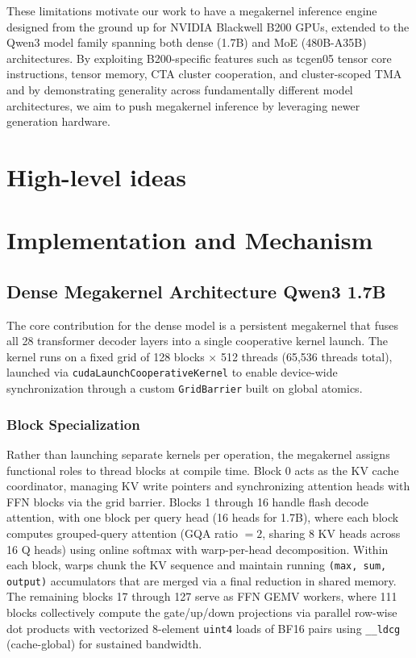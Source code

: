 \documentclass[sigplan,screen]{acmart}
\begin{document}
These limitations motivate our work to have a megakernel inference engine designed from the ground up for NVIDIA Blackwell B200 GPUs, extended to the Qwen3 model family spanning both dense (1.7B) and MoE (480B-A35B) architectures. By exploiting B200-specific features such as tcgen05 tensor core instructions, tensor memory, CTA cluster cooperation, and cluster-scoped TMA and by demonstrating generality across fundamentally different model architectures, we aim to push megakernel inference by leveraging newer generation hardware.

\section{High-level ideas}
\section{Implementation and Mechanism}
\subsection{Dense Megakernel Architecture Qwen3 1.7B}

The core contribution for the dense model is a persistent megakernel that fuses all 28 transformer decoder layers into a single cooperative kernel launch. The kernel runs on a fixed grid of 128 blocks $\times$ 512 threads (65{,}536 threads total), launched via \texttt{cudaLaunchCooperativeKernel} to enable device-wide synchronization through a custom \newline \texttt{GridBarrier} built on global atomics.

\subsubsection{Block Specialization}

Rather than launching separate kernels per operation, the megakernel assigns functional roles to thread blocks at compile time. Block 0 acts as the KV cache coordinator, managing KV write pointers and synchronizing attention heads with FFN blocks via the grid barrier. Blocks 1 through 16 handle flash decode attention, with one block per query head (16 heads for 1.7B), where each block computes grouped-query attention (GQA ratio $= 2$, sharing 8 KV heads across 16 Q heads) using online softmax with warp-per-head decomposition. Within each block, warps chunk the KV sequence and maintain running \texttt{(max, sum, output)} accumulators that are merged via a final reduction in shared memory. The remaining blocks 17 through 127 serve as FFN GEMV workers, where 111 blocks collectively compute the gate/up/down projections via parallel row-wise dot products with vectorized 8-element \texttt{uint4} loads of BF16 pairs using \texttt{\_\_ldcg} (cache-global) for sustained bandwidth.
\end{document}
